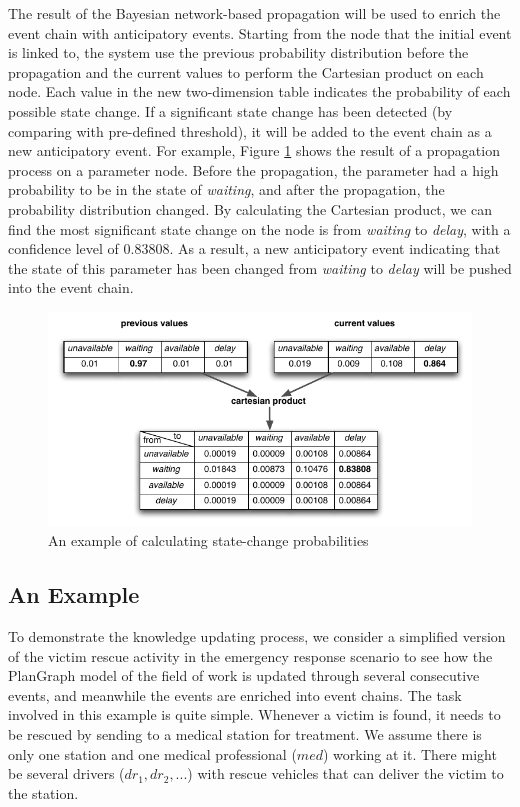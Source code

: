 The result of the Bayesian network-based propagation will be used to enrich the event chain with anticipatory events. Starting from the node that the initial event is linked to, the system use the previous probability distribution before the propagation and the current values to perform the Cartesian product on each node. Each value in the new two-dimension table indicates the probability of each possible state change. If a significant state change has been detected (by comparing with pre-defined threshold), it will be added to the event chain as a new anticipatory event. For example, Figure \ref{fig:prob_state_change} shows the result of a propagation process on a parameter node. Before the propagation, the parameter had a high probability to be in the state of \emph{waiting}, and after the propagation, the probability distribution changed. By calculating the Cartesian product, we can find the most significant state change on the node is from \emph{waiting} to \emph{delay}, with a confidence level of $0.83808$. As a result, a new anticipatory event indicating that the state of this parameter has been changed from \emph{waiting} to \emph{delay} will be pushed into the event chain.
\begin{figure}[htbp] %
	\centering
	\includegraphics{prob_state_change.pdf} 
	\caption{An example of calculating state-change probabilities}
	\label{fig:prob_state_change}
\end{figure}
\subsection{An Example} %
\label{sub:an_example}
To demonstrate the knowledge updating process, we consider a simplified version of the victim rescue activity in the emergency response scenario to see how the PlanGraph model of the field of work is updated through several consecutive events, and meanwhile the events are enriched into event chains. The task involved in this example is quite simple. Whenever a victim is found, it needs to be rescued by sending to a medical station for treatment. We assume there is only one station and one medical professional ($med$) working at it. There might be several drivers ($dr_1, dr_2, ...$) with rescue vehicles that can deliver the victim to the station.   

